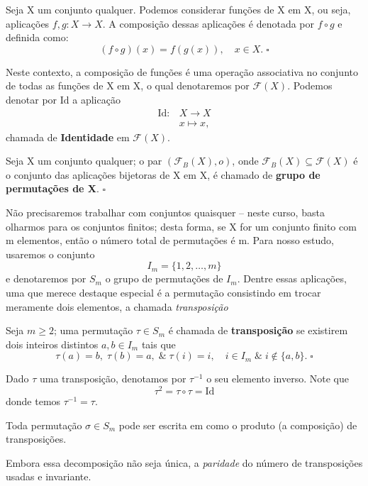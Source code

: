 \documentclass[../differential_forms.tex]{subfiles}
\begin{document}
\begin{def*}
	Seja X um conjunto qualquer. Podemos considerar funções de X em X, ou seja, aplicações \(f, g :X\rightarrow X\). A composição dessas aplicações é denotada por \(f\circ g\) e definida como:
	\[
		(f\circ g)(x) = f(g(x)),\quad x\in X.\; \square
	\]
\end{def*}
Neste contexto, a composição de funções é uma operação associativa no conjunto de todas as funções de X em X, o qual denotaremos por \(\mathcal{F}(X).\) Podemos denotar por \(\mathrm{Id}\) a aplicação
\begin{align*}
	\mathrm{Id}: & X\rightarrow X  \\
	             & x\longmapsto x,
\end{align*}
chamada de \textbf{Identidade} em \(\mathcal{F}(X)\).
\begin{def*}
	Seja X um conjunto qualquer; o par \((\mathcal{F}_B(X), o)\), onde \(\mathcal{F}_B(X)\subseteq \mathcal{F}(X)\) é o conjunto das aplicações bijetoras de X em X, é chamado de \textbf{grupo de permutações de X}. \(\square\)
\end{def*}
Não precisaremos trabalhar com conjuntos quaisquer -- neste curso, basta olharmos para os conjuntos finitos; desta forma, se X for um conjunto finito com m elementos, então o número total de permutações é m. Para nosso estudo, usaremos o conjunto
\[
	I_{m}=\{1, 2, \dotsc , m\}
\]
e denotaremos por \(S_{m}\) o grupo de permutações de \(I_{m}\). Dentre essas aplicações, uma que merece destaque especial é a permutação consistindo em trocar meramente dois elementos, a chamada \textit{transposição}
\begin{def*}
	Seja \(m\geq 2\); uma permutação \(\tau \in S_{m}\) é chamada de \textbf{transposição} se existirem dois inteiros distintos \(a, b\in I_{m}\) tais que
	\[
		\tau (a) =b,\; \tau (b) = a,\;\&\; \tau (i) = i,\quad i\in I_{m}\;\&\; i\not\in \{a, b\}. \; \square
	\]
\end{def*}
\begin{tcolorbox}[
		skin=enhanced,
		title=Observação,
		fonttitle=\bfseries,
		colframe=black,
		colbacktitle=cyan!75!white,
		colback=cyan!15,
		colbacklower=black,
		coltitle=black,
		drop fuzzy shadow,
	]
	Dado \(\tau \) uma transposição, denotamos por \(\tau^{-1}\) o seu elemento inverso. Note que
	\[
		\tau^{2} = \tau \circ \tau = \mathrm{Id}
	\]
	donde temos \(\tau^{-1}=\tau .\)
\end{tcolorbox}
\begin{prop*}
	Toda permutação \(\sigma \in S_{m}\) pode ser escrita em como o produto (a composição) de transposições.

	Embora essa decomposição não seja única, a \textit{paridade} do número de transposições usadas e invariante.
\end{prop*}
\end{document}

